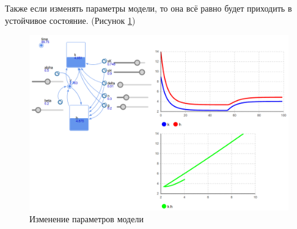 \documentclass[14pt,fleqn]{extarticle}
\begin{document}
	Также если изменять параметры модели, то она всё равно будет приходить в устойчивое состояние. (Рисунок \ref{fig:M-R-W_anylogic_variance})
	\begin{figure}[h]
		\centering \includegraphics[scale=0.25]{M-R-W_anylogic_variance}
		\caption{Изменение параметров модели}
		\label{fig:M-R-W_anylogic_variance}
	\end{figure}
\end{document}
